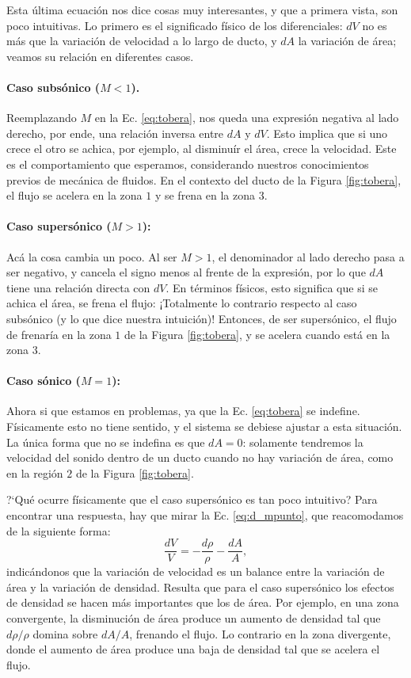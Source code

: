 Esta última ecuación nos dice cosas muy interesantes, y que a primera vista, son poco intuitivas.
Lo primero es el significado físico de los diferenciales: $dV$ no es más que la variación de velocidad a lo largo de ducto, y $dA$ la variación de área; veamos su relación en diferentes casos.
%
\paragraph*{Caso subsónico ($M<1$).} Reemplazando $M$ en la Ec. \eqref{eq:tobera}, nos queda una expresión negativa al lado derecho, por ende, una relación inversa entre $dA$ y $dV$.
Esto implica que si uno crece el otro se achica, por ejemplo, al disminuír el área, crece la velocidad.
Este es el comportamiento que esperamos, considerando nuestros conocimientos previos de mecánica de fluidos.
En el contexto del ducto de la Figura \ref{fig:tobera}, el flujo se acelera en la zona $1$ y se frena en la zona $3$.
%
\paragraph*{Caso supersónico ($M>1$):} Acá la cosa cambia un poco. Al ser $M>1$, el denominador al lado derecho pasa a ser negativo, y cancela el signo menos al frente de la expresión, por lo que $dA$ tiene una relación directa con $dV$.
En términos físicos, esto significa que si se achica el área, se frena el flujo: ¡Totalmente lo contrario respecto al caso subsónico (y lo que dice nuestra intuición)!
Entonces, de ser supersónico, el flujo de frenaría en la zona $1$ de la Figura \ref{fig:tobera}, y se acelera cuando está en la zona $3$.
%
\paragraph*{Caso sónico ($M=1$):} Ahora si que estamos en problemas, ya que la Ec. \eqref{eq:tobera} se indefine.
Físicamente esto no tiene sentido, y el sistema se debiese ajustar a esta situación.
La única forma que no se indefina es que $dA=0$: solamente tendremos la velocidad del sonido dentro de un ducto cuando no hay variación de área, como en la región $2$ de la Figura \ref{fig:tobera}.

\mbox{?`}Qué ocurre físicamente que el caso supersónico es tan poco intuitivo?
Para encontrar una respuesta, hay que mirar la Ec. \eqref{eq:d_mpunto}, que reacomodamos de la siguiente forma:
%
\begin{equation}
\frac{dV}{V} = -\frac{d\rho}{\rho} - \frac{dA}{A},
\end{equation}
%
indicándonos que la variación de velocidad es un balance entre la variación de área y la variación de densidad.
Resulta que para el caso supersónico los efectos de densidad se hacen más importantes que los de área.
Por ejemplo, en una zona convergente, la disminución de área produce un aumento de densidad tal que $d\rho/\rho$ domina sobre $dA/A$, frenando el flujo.
Lo contrario en la zona divergente, donde el aumento de área produce una baja de densidad tal que se acelera el flujo.

